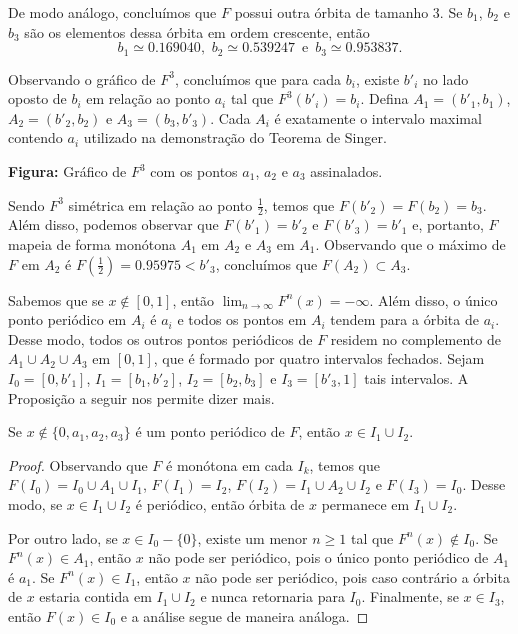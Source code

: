 De modo análogo, concluímos que $F$ possui outra órbita de tamanho $3$. Se $b_1$, $b_2$ e $b_3$ são os elementos dessa órbita em ordem crescente, então
$$b_1 \simeq 0.169040 \text{, } \, b_2 \simeq 0.539247 \,  \text{ e } \, b_3 \simeq 0.953837.$$

Observando o gráfico de $F^3$, concluímos que para cada $b_i$, existe $b'_i$ no lado oposto de $b_i$ em relação ao ponto $a_i$ tal que $F^3(b'_i) = b_i$. Defina $A_1 = (b'_1, b_1)$, $A_2 = (b'_2, b_2)$ e $A_3 = (b_3, b'_3)$. Cada $A_i$ é exatamente o intervalo maximal contendo $a_i$ utilizado na demonstração do Teorema de Singer.

\begin{center}
{\small \textbf{Figura:} Gráfico de $F^3$ com os pontos $a_1$, $a_2$ e $a_3$ assinalados.}
\end{center}

Sendo $F^3$ simétrica em relação ao ponto $\frac{1}{2}$, temos que $F(b'_2) = F(b_2) = b_3$.
Além disso, podemos observar que $F(b'_1) = b'_2$ e $F(b'_3) = b'_1$ e, portanto, $F$ mapeia de forma monótona $A_1$ em $A_2$ e $A_3$ em $A_1$. Observando que o máximo de $F$ em $A_2$ é $F( \frac{1}{2}) = 0.95975 < b'_3$, concluímos que $F(A_2) \subset A_3$.

Sabemos que se $x \notin [0, 1]$, então $\lim_{n \to \infty} F^n(x) = -\infty$.
Além disso, o único ponto periódico em $A_i$ é $a_i$ e todos os pontos em $A_i$ tendem para a órbita de $a_i$.
Desse modo, todos os outros pontos periódicos de $F$ residem no complemento de $A_1 \cup A_2 \cup A_3$ em $[0, 1]$, que é formado por quatro intervalos fechados. Sejam $I_0 = [0, b'_1]$, $I_1 = [b_1, b'_2]$, $I_2 = [b_2, b_3]$ e $I_3 = [b'_3, 1]$ tais intervalos. A Proposição a seguir nos permite dizer mais.

\begin{proposition}
Se $x \notin \lbrace 0, a_1, a_2, a_3 \rbrace$ é um ponto periódico de $F$, então $x \in I_1 \cup I_2$.
\end{proposition}

\begin{proof}
Observando que $F$ é monótona em cada $I_k$, temos que $F(I_0) = I_0 \cup A_1 \cup I_1$, $F(I_1) = I_2$, $F(I_2) = I_1 \cup A_2 \cup I_2$ e $F(I_3) = I_0$. Desse modo, se $x \in I_1 \cup I_2$ é periódico, então órbita de $x$ permanece em $I_1 \cup I_2$.

Por outro lado, se $x \in I_0 - \lbrace 0 \rbrace$, existe um menor $n \geq 1$ tal que $F^n(x) \notin I_0$. Se $F^n(x) \in A_1$, então $x$ não pode ser periódico, pois o único ponto periódico de $A_1$ é $a_1$.
Se $F^n(x) \in I_1$, então $x$ não pode ser periódico, pois caso contrário a órbita de $x$ estaria contida em $I_1 \cup I_2$ e nunca retornaria para $I_0$.
Finalmente, se $x \in I_3$, então $F(x) \in I_0$ e a análise segue de maneira análoga.
\end{proof}

